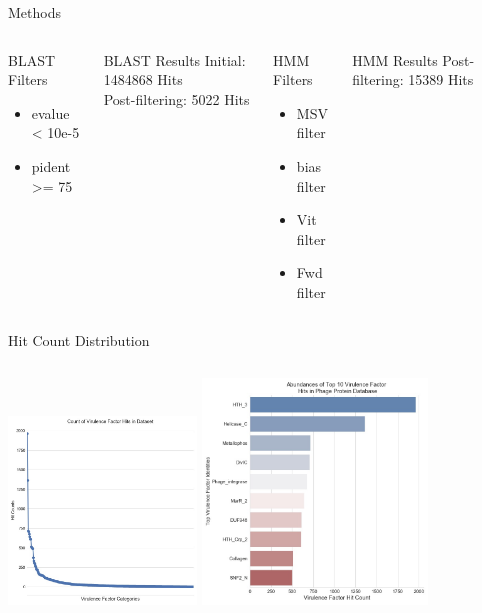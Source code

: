 \documentclass[11pt]{beamer}
\begin{document}
	
	\begin{frame}{Methods}
	\begin{columns}
	\begin{block}{BLAST Filters}
	\begin{itemize}
	\item evalue < 10e-5
	\item pident >= 75
	\end{itemize}
	\end{block}
	
	\begin{block}{BLAST Results}
	Initial: 1484868 Hits \\
	Post-filtering: 5022 Hits
	\end{block}
	
	\begin{block}{HMM Filters}
	\begin{itemize}
	\item MSV filter
	\item bias filter
	\item Vit filter 
	\item Fwd filter
	\end{itemize}
	\end{block}
	
	\begin{block}{HMM Results}
	Post-filtering: 15389 Hits
	\end{block}

	\end{columns}
	\end{frame}
	
	\begin{frame}{Hit Count Distribution}
	\begin{columns}
	\column{0.5\textwidth}
	\includegraphics[height=5cm, width=5cm]{HMM_Hit_Counts.jpg}
	\column{0.5\textwidth}
	\includegraphics[height=6cm, width=6cm]{Top_VF_Hit_Plot.jpg}
	\end{columns}
	\end{frame}
	
\end{document}

